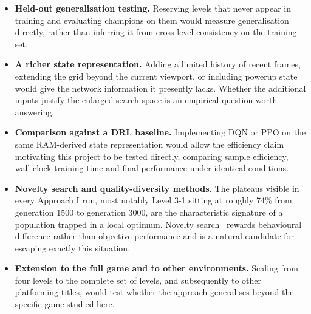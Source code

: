 \begin{itemize}
    \item \textbf{Held-out generalisation testing.} Reserving levels that never
    appear in training and evaluating champions on them would measure
    generalisation directly, rather than inferring it from cross-level
    consistency on the training set.

    \item \textbf{A richer state representation.} Adding a limited history of
    recent frames, extending the grid beyond the current viewport, or including
    powerup state would give the network information it presently lacks.
    Whether the additional inputs justify the enlarged search space is an
    empirical question worth answering.

    \item \textbf{Comparison against a DRL baseline.} Implementing DQN or PPO
    on the same RAM-derived state representation would allow the efficiency
    claim motivating this project to be tested directly, comparing sample
    efficiency, wall-clock training time and final performance under identical
    conditions.

    \item \textbf{Novelty search and quality-diversity methods.} The plateaus
    visible in every Approach I run, most notably Level 3-1 sitting at roughly
    74\% from generation 1500 to generation 3000, are the characteristic
    signature of a population trapped in a local optimum. Novelty
    search~\cite{lehman2011} rewards behavioural difference rather than
    objective performance and is a natural candidate for escaping exactly this
    situation.

    \item \textbf{Extension to the full game and to other environments.}
    Scaling from four levels to the complete set of levels, and subsequently to
    other platforming titles, would test whether the approach generalises
    beyond the specific game studied here.
\end{itemize}

